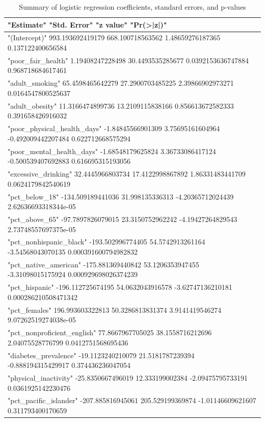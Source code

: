 \documentclass[
]{article}
\begin{document}
\begin{table}

\caption{\label{tab:model-comparison}Summary of logistic regression coefficients, standard errors, 
        and p-values}
\centering
\begin{tabular}[t]{l}
\toprule
"Estimate" "Std. Error" "z value" "Pr(>|z|)"\\
\midrule
"(Intercept)" 993.193692419179 668.100718563562 1.48659276187365 0.137122400656584\\
"poor\_fair\_health" 1.19408247228498 30.4493535285677 0.0392153636747884 0.968718684617461\\
"adult\_smoking" 65.4598465642279 27.2900703485225 2.39866902973271 0.0164547800525637\\
"adult\_obesity" 11.3166474899736 13.2109115838166 0.856613672582333 0.391658426916032\\
"poor\_physical\_health\_days" -1.84845566901309 3.75695161604964 -0.492009442207484 0.622712668575294\\
\addlinespace
"poor\_mental\_health\_days" -1.68548179625824 3.36733086417124 -0.500539407692883 0.616695315193056\\
"excessive\_drinking" 32.4445966803734 17.4122998867892 1.86331483441709 0.0624179842540619\\
"pct\_below\_18" -134.509189441036 31.998135336313 -4.20365712024439 2.62636693318344e-05\\
"pct\_above\_65" -97.7897826079015 23.3150752962242 -4.19427264829543 2.73748557697375e-05\\
"pct\_nonhispanic\_black" -193.502996774405 54.5742913261164 -3.54568043070135 0.000391600794982832\\
\addlinespace
"pct\_native\_american" -175.881369440842 53.1206353947455 -3.31098015175924 0.000929698026374239\\
"pct\_hispanic" -196.112725674195 54.0632043916578 -3.62747136210181 0.000286210508471342\\
"pct\_females" 196.993603322813 50.3286813831374 3.9141419546274 9.07262519274038e-05\\
"pct\_nonproficient\_english" 77.8667967705025 38.1558716212696 2.04075528776799 0.0412751568695436\\
"diabetes\_prevalence" -19.1123240210079 21.5181787239394 -0.888194315429917 0.374436236047054\\
\addlinespace
"physical\_inactivity" -25.8350667496019 12.333199002384 -2.09475795733191 0.0361925142230476\\
"pct\_pacific\_islander" -207.885816945061 205.529199369874 -1.01146609621607 0.311793400170659\\

\end{tabular}
\end{table}
\end{document}
